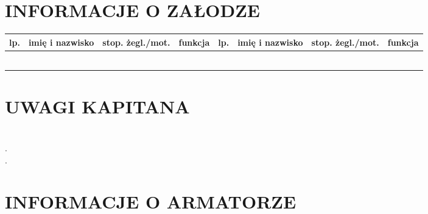 \documentclass{article}
\begin{document}
\section*{INFORMACJE O ZAŁODZE}
    \begin{tabular}{|m{}|m{}|m{}|m{}||m{}|m{}|m{}|m{}|}
    \hline
    lp. & imię i nazwisko & stop. żegl./mot. & funkcja & lp. & imię i nazwisko &stop. żegl./mot. & funkcja\\
    \hline
    
&&&&&&&\\
\hline
&&&&&&&\\
\hline
&&&&&&&\\
\hline
&&&&&&&\\
\hline
&&&&&&&\\
\hline
&&&&&&&\\
\hline

    \end{tabular}
    
    
\section*{UWAGI KAPITANA}


\textit{}\dotfill \\
.\dotfill \\
.\dotfill \\
\section*{INFORMACJE O ARMATORZE}
\end{document}
